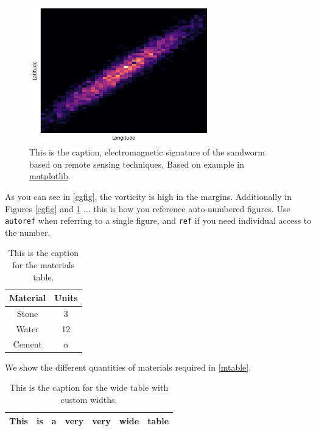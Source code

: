 \begin{figure}[]
    \includegraphics[width=0.7\textwidth]{figure2.png}
    \caption{This is the caption, electromagnetic signature of the sandworm based on remote sensing techniques. Based on example in \href{https://matplotlib.org/stable/plot_types/stats/hist2d.html}{matplotlib}. \label{egfig2}}
\end{figure}

As you can see in \autoref{egfig}, the vorticity is high in the margins. Additionally in Figures \ref{egfig} and \ref{egfig2} ... this is how you reference auto-numbered figures.
Use \texttt{autoref} when referring to a single figure, and \texttt{ref} if you need individual access to the number.

\begin{table}
    \centering
    \caption{This is the caption for the materials table.\label{mtable}}
    \begin{tabular}{cc}
    \toprule
    \textbf{Material} & \textbf{Units} \\
    \midrule
    Stone & 3 \\
    Water & 12 \\
    Cement & $\alpha$ \\
    \bottomrule
    \end{tabular}
\end{table}

We show the different quantities of materials required in \autoref{mtable}.


\begin{longtable}[c]{p{}p{}p{}p{}p{}p{}p{}}
    \caption{This is the caption for the wide table with custom widths.\label{wide-table}} \\
    \toprule
    This & is & a & very & very & wide & table \\
    \bottomrule
\end{longtable}

